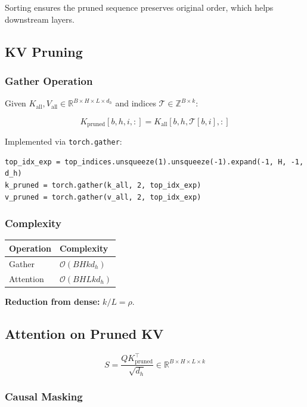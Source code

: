 Sorting ensures the pruned sequence preserves original order, which helps 
downstream layers.

\subsection{KV Pruning}

\subsubsection{Gather Operation}

Given $K_\text{all}, V_\text{all} \in \mathbb{R}^{B \times H \times L \times d_h}$ 
and indices $\mathcal{T} \in \mathbb{Z}^{B \times k}$:

\[
K_\text{pruned}[b, h, i, :] = K_\text{all}[b, h, \mathcal{T}[b, i], :]
\tag{4.3}
\]

Implemented via \texttt{torch.gather}:

\begin{lstlisting}
top_idx_exp = top_indices.unsqueeze(1).unsqueeze(-1).expand(-1, H, -1, d_h)
k_pruned = torch.gather(k_all, 2, top_idx_exp)
v_pruned = torch.gather(v_all, 2, top_idx_exp)
\end{lstlisting}

\subsubsection{Complexity}

\begin{table}[H]
\centering
\small
\begin{tabular}{ll}
\toprule
\textbf{Operation} & \textbf{Complexity} \\
\midrule
Gather & $\mathcal{O}(B H k d_h)$ \\
Attention & $\mathcal{O}(B H L k d_h)$ \\
\bottomrule
\end{tabular}
\end{table}

\textbf{Reduction from dense:} $k / L = \rho$.

\subsection{Attention on Pruned KV}

\[
S = \frac{Q K_\text{pruned}^\top}{\sqrt{d_h}} \in \mathbb{R}^{B \times H \times L \times k}
\tag{4.4}
\]

\subsubsection{Causal Masking}

